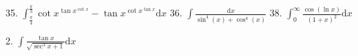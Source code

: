 \documentclass{article}
\newcommand{\dd}{\mathrm{d}}
\begin{document}
\begin{flushleft}
35. $\int_{\frac{\pi}{4}}^{\frac{\pi}{3}}  \cot{x}^{\tan{x}^{\cot{x}}}-\tan{x}^{\cot{x}^{\tan{x}}} \dd x$ \newline  \newline \newline 
36. $\int \frac{\dd x}{\sin^4(x)+\cos^4(x)}$ \newline  \newline \newline 
38. $\int_0^{\infty} \frac{\cos(\ln{x})}{(1+x)^2} \dd x$ \newline  \newline \newline 

2. $\int \frac{\tan{x}}{\sqrt{\sec^3{x}+1}} \dd x$ \newline  \newline \newline 























\end{flushleft}
\end{document}
